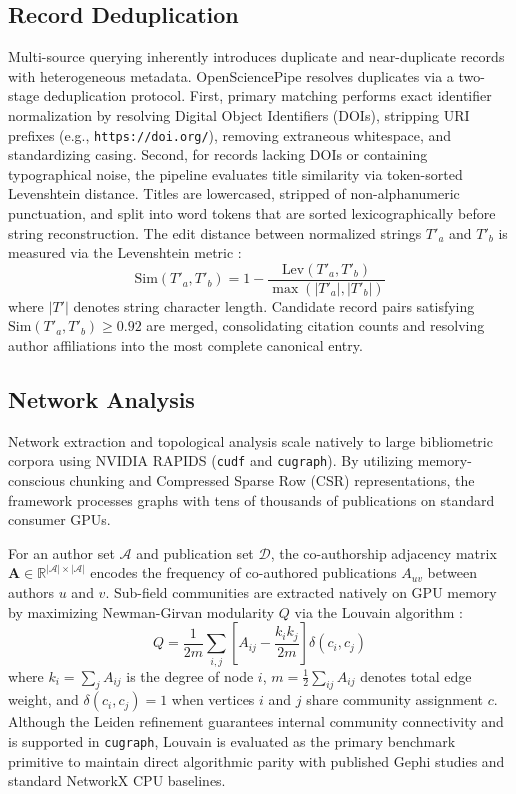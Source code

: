 \documentclass[preprint,12pt]{elsarticle}
\begin{document}
\subsection{Record Deduplication}
Multi-source querying inherently introduces duplicate and near-duplicate records with heterogeneous metadata. OpenSciencePipe resolves duplicates via a two-stage deduplication protocol. First, primary matching performs exact identifier normalization by resolving Digital Object Identifiers (DOIs), stripping URI prefixes (e.g., \texttt{https://doi.org/}), removing extraneous whitespace, and standardizing casing. Second, for records lacking DOIs or containing typographical noise, the pipeline evaluates title similarity via token-sorted Levenshtein distance. Titles are lowercased, stripped of non-alphanumeric punctuation, and split into word tokens that are sorted lexicographically before string reconstruction. The edit distance between normalized strings $T'_a$ and $T'_b$ is measured via the Levenshtein metric \cite{levenshtein1966binary}:
\begin{equation}
\text{Sim}(T'_a, T'_b) = 1 - \frac{\text{Lev}(T'_a, T'_b)}{\max(|T'_a|, |T'_b|)}
\end{equation}
where $|T'|$ denotes string character length. Candidate record pairs satisfying $\text{Sim}(T'_a, T'_b) \ge 0.92$ are merged, consolidating citation counts and resolving author affiliations into the most complete canonical entry.

\subsection{Network Analysis}
\label{sec:tier3}
Network extraction and topological analysis scale natively to large bibliometric corpora using NVIDIA RAPIDS (\texttt{cudf} and \texttt{cugraph}). By utilizing memory-conscious chunking and Compressed Sparse Row (CSR) representations, the framework processes graphs with tens of thousands of publications on standard consumer GPUs.

For an author set $\mathcal{A}$ and publication set $\mathcal{D}$, the co-authorship adjacency matrix $\mathbf{A} \in \mathbb{R}^{|\mathcal{A}| \times |\mathcal{A}|}$ encodes the frequency of co-authored publications $A_{uv}$ between authors $u$ and $v$. Sub-field communities are extracted natively on GPU memory by maximizing Newman-Girvan modularity $Q$ via the Louvain algorithm \cite{blondel2008fast}:
\begin{equation}
\label{eq:modularity}
Q = \frac{1}{2m} \sum_{i,j} \left[ A_{ij} - \frac{k_i k_j}{2m} \right] \delta(c_i, c_j)
\end{equation}
where $k_i = \sum_j A_{ij}$ is the degree of node $i$, $m = \frac{1}{2}\sum_{ij} A_{ij}$ denotes total edge weight, and $\delta(c_i, c_j) = 1$ when vertices $i$ and $j$ share community assignment $c$. Although the Leiden refinement \cite{traag2019louvain} guarantees internal community connectivity and is supported in \texttt{cugraph}, Louvain is evaluated as the primary benchmark primitive to maintain direct algorithmic parity with published Gephi studies and standard NetworkX CPU baselines.
\end{document}
